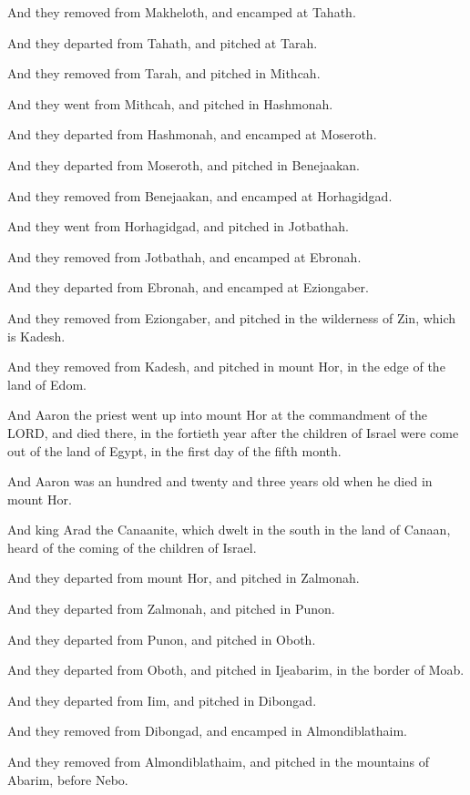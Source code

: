 \Verse And they removed from Makheloth, and encamped at Tahath.

\Verse And they departed from Tahath, and pitched at Tarah.

\Verse And they removed from Tarah, and pitched in Mithcah.

\Verse And they went from Mithcah, and pitched in Hashmonah.

\Verse And they departed from Hashmonah, and encamped at Moseroth.

\Verse And they departed from Moseroth, and pitched in Benejaakan.

\Verse And they removed from Benejaakan, and encamped at Horhagidgad.

\Verse And they went from Horhagidgad, and pitched in Jotbathah.

\Verse And they removed from Jotbathah, and encamped at Ebronah.

\Verse And they departed from Ebronah, and encamped at Eziongaber.

\Verse And they removed from Eziongaber, and pitched in the wilderness
of Zin, which is Kadesh.

\Verse And they removed from Kadesh, and pitched in mount Hor, in the
edge of the land of Edom.

\Verse And Aaron the priest went up into mount Hor at the commandment
of the LORD, and died there, in the fortieth year after the children
of Israel were come out of the land of Egypt, in the first day of the
fifth month.

\Verse And Aaron was an hundred and twenty and three years old when he
died in mount Hor.

\Verse And king Arad the Canaanite, which dwelt in the south in the
land of Canaan, heard of the coming of the children of Israel.

\Verse And they departed from mount Hor, and pitched in Zalmonah.

\Verse And they departed from Zalmonah, and pitched in Punon.

\Verse And they departed from Punon, and pitched in Oboth.

\Verse And they departed from Oboth, and pitched in Ijeabarim, in the
border of Moab.

\Verse And they departed from Iim, and pitched in Dibongad.

\Verse And they removed from Dibongad, and encamped in Almondiblathaim.

\Verse And they removed from Almondiblathaim, and pitched in the
mountains of Abarim, before Nebo.

